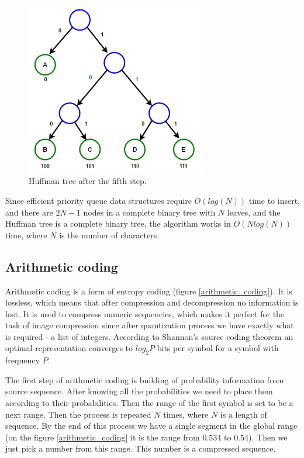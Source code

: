 \begin{figure}[!ht]
    \centering
    \includegraphics[width=0.7\textwidth]{figure/huffman-5.png}
    \caption{Huffman tree after the fifth step.}
    \label{huffman-5}
\end{figure}

Since efficient priority queue data structures require $O(log(N))$ time to insert, and there are $2N-1$ nodes in a complete binary tree with $N$ leaves, and the Huffman tree is a complete binary tree, the algorithm works in $O(N log(N))$ time, where $N$ is the number of characters.

\subsection{Arithmetic coding}

Arithmetic coding is a form of entropy coding (figure \ref{arithmetic_coding}). It is lossless, which means that after compression and decompression no information is lost. It is used to compress numeric sequencies, which makes it perfect for the task of image compression since after quantization process we have exactly what is required - a list of integers. According to Shannon's source coding theorem an optimal representation converges to $log_2P$ bits per symbol for a symbol with frequency $P$.

The first step of arithmetic coding is building of probability information from source sequence. After knowing all the probabilities we need to place them according to their probabilities. Then the range of the first symbol is set to be a next range. Then the process is repeated $N$ times, where $N$ is a length of sequence. By the end of this process we have a single segment in the global range (on the figure \ref{arithmetic_coding} it is the range from $0.534$ to $0.54$). Then we just pick a number from this range. This number is a compressed sequence.

